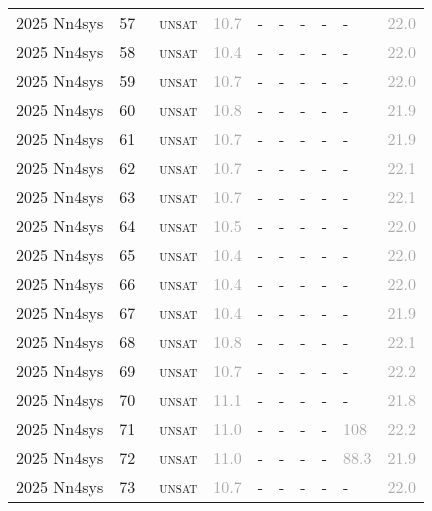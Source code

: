 \begin{center}
{\begin{longtable}{@{}llllllllll@{}}
2025 Nn4sys & 57 & ~\textsc{unsat} & \textcolor{darkgray}{10.7} & - & - & - & - & - & \textcolor{darkgray}{22.0} \\
2025 Nn4sys & 58 & ~\textsc{unsat} & \textcolor{darkgray}{10.4} & - & - & - & - & - & \textcolor{darkgray}{22.0} \\
2025 Nn4sys & 59 & ~\textsc{unsat} & \textcolor{darkgray}{10.7} & - & - & - & - & - & \textcolor{darkgray}{22.0} \\
2025 Nn4sys & 60 & ~\textsc{unsat} & \textcolor{darkgray}{10.8} & - & - & - & - & - & \textcolor{darkgray}{21.9} \\
2025 Nn4sys & 61 & ~\textsc{unsat} & \textcolor{darkgray}{10.7} & - & - & - & - & - & \textcolor{darkgray}{21.9} \\
2025 Nn4sys & 62 & ~\textsc{unsat} & \textcolor{darkgray}{10.7} & - & - & - & - & - & \textcolor{darkgray}{22.1} \\
2025 Nn4sys & 63 & ~\textsc{unsat} & \textcolor{darkgray}{10.7} & - & - & - & - & - & \textcolor{darkgray}{22.1} \\
2025 Nn4sys & 64 & ~\textsc{unsat} & \textcolor{darkgray}{10.5} & - & - & - & - & - & \textcolor{darkgray}{22.0} \\
2025 Nn4sys & 65 & ~\textsc{unsat} & \textcolor{darkgray}{10.4} & - & - & - & - & - & \textcolor{darkgray}{22.0} \\
2025 Nn4sys & 66 & ~\textsc{unsat} & \textcolor{darkgray}{10.4} & - & - & - & - & - & \textcolor{darkgray}{22.0} \\
2025 Nn4sys & 67 & ~\textsc{unsat} & \textcolor{darkgray}{10.4} & - & - & - & - & - & \textcolor{darkgray}{21.9} \\
2025 Nn4sys & 68 & ~\textsc{unsat} & \textcolor{darkgray}{10.8} & - & - & - & - & - & \textcolor{darkgray}{22.1} \\
2025 Nn4sys & 69 & ~\textsc{unsat} & \textcolor{darkgray}{10.7} & - & - & - & - & - & \textcolor{darkgray}{22.2} \\
2025 Nn4sys & 70 & ~\textsc{unsat} & \textcolor{darkgray}{11.1} & - & - & - & - & - & \textcolor{darkgray}{21.8} \\
2025 Nn4sys & 71 & ~\textsc{unsat} & \textcolor{darkgray}{11.0} & - & - & - & - & \textcolor{darkgray}{108} & \textcolor{darkgray}{22.2} \\
2025 Nn4sys & 72 & ~\textsc{unsat} & \textcolor{darkgray}{11.0} & - & - & - & - & \textcolor{darkgray}{88.3} & \textcolor{darkgray}{21.9} \\
2025 Nn4sys & 73 & ~\textsc{unsat} & \textcolor{darkgray}{10.7} & - & - & - & - & - & \textcolor{darkgray}{22.0} \\

\end{longtable}}
\end{center}
